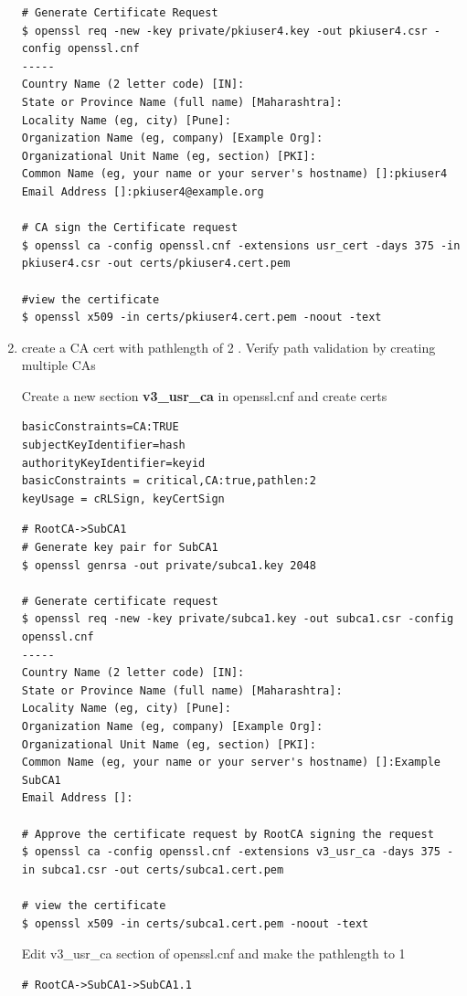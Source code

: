 \documentclass[a4paper]{article}
\begin{document}
\begin{enumerate}[label*=\arabic*.]
\begin{lstlisting}[style=bashInputStyle]
# Generate Certificate Request
$ openssl req -new -key private/pkiuser4.key -out pkiuser4.csr -config openssl.cnf
-----
Country Name (2 letter code) [IN]:
State or Province Name (full name) [Maharashtra]:
Locality Name (eg, city) [Pune]:
Organization Name (eg, company) [Example Org]:
Organizational Unit Name (eg, section) [PKI]:
Common Name (eg, your name or your server's hostname) []:pkiuser4
Email Address []:pkiuser4@example.org

# CA sign the Certificate request 
$ openssl ca -config openssl.cnf -extensions usr_cert -days 375 -in pkiuser4.csr -out certs/pkiuser4.cert.pem

#view the certificate
$ openssl x509 -in certs/pkiuser4.cert.pem -noout -text
        \end{lstlisting}

    \item create a CA cert with pathlength of 2 . Verify path validation by creating multiple CAs

        Create a new section \textbf{v3\_usr\_ca} in openssl.cnf and create certs
        \begin{lstlisting}
basicConstraints=CA:TRUE        
subjectKeyIdentifier=hash
authorityKeyIdentifier=keyid
basicConstraints = critical,CA:true,pathlen:2
keyUsage = cRLSign, keyCertSign
        \end{lstlisting}
        \begin{lstlisting}[style=bashInputStyle]
# RootCA->SubCA1
# Generate key pair for SubCA1 
$ openssl genrsa -out private/subca1.key 2048

# Generate certificate request
$ openssl req -new -key private/subca1.key -out subca1.csr -config openssl.cnf
-----
Country Name (2 letter code) [IN]:
State or Province Name (full name) [Maharashtra]:
Locality Name (eg, city) [Pune]:
Organization Name (eg, company) [Example Org]:
Organizational Unit Name (eg, section) [PKI]:
Common Name (eg, your name or your server's hostname) []:Example SubCA1
Email Address []:

# Approve the certificate request by RootCA signing the request
$ openssl ca -config openssl.cnf -extensions v3_usr_ca -days 375 -in subca1.csr -out certs/subca1.cert.pem
    
# view the certificate
$ openssl x509 -in certs/subca1.cert.pem -noout -text
        \end{lstlisting}
        Edit v3\_usr\_ca section of openssl.cnf and make the pathlength to 1 
        \begin{lstlisting}[style=bashInputStyle]
# RootCA->SubCA1->SubCA1.1


\end{lstlisting}
\end{enumerate}
\end{document}
